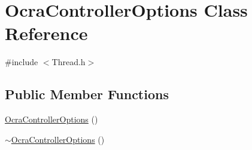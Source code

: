 \hypertarget{classOcraControllerOptions}{\section{\-Ocra\-Controller\-Options \-Class \-Reference}
\label{classOcraControllerOptions}
}


{\ttfamily \#include $<$\-Thread.\-h$>$}

\subsection*{\-Public \-Member \-Functions}
\begin{DoxyCompactItemize}
\item 
\hyperlink{classOcraControllerOptions_a1a91de992c42c6da488e95cd594eca80}{\-Ocra\-Controller\-Options} ()
\item 
\hyperlink{classOcraControllerOptions_a22f514e92ccf91cc362c48a6c340ac19}{$\sim$\-Ocra\-Controller\-Options} ()
\end{DoxyCompactItemize}
